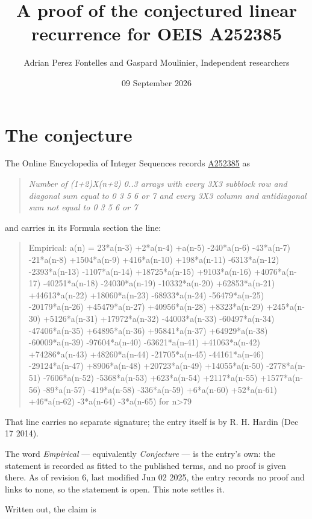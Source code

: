 \documentclass[11pt]{article}
\title{A proof of the conjectured linear recurrence for OEIS A252385}
\author{Adrian Perez Fontelles and Gaspard Moulinier, Independent researchers}
\date{09 September 2026}
\theoremstyle{definition}
\begin{document}
\maketitle
\section{The conjecture}

The Online Encyclopedia of Integer Sequences records \href{https://oeis.org/A252385}{A252385} as

\begin{quote}\itshape Number of (1+2)X(n+2) 0..3 arrays with every 3X3 subblock row and diagonal sum equal to 0 3 5 6 or 7 and every 3X3 column and antidiagonal sum not equal to 0 3 5 6 or 7\end{quote}

and carries in its Formula section the line:

\begin{quote}\ttfamily Empirical: a(n) = 23*a(n-3) +2*a(n-4) +a(n-5) -240*a(n-6) -43*a(n-7) -21*a(n-8) +1504*a(n-9) +416*a(n-10) +198*a(n-11) -6313*a(n-12) -2393*a(n-13) -1107*a(n-14) +18725*a(n-15) +9103*a(n-16) +4076*a(n-17) -40251*a(n-18) -24030*a(n-19) -10332*a(n-20) +62853*a(n-21) +44613*a(n-22) +18060*a(n-23) -68933*a(n-24) -56479*a(n-25) -20179*a(n-26) +45479*a(n-27) +40956*a(n-28) +8323*a(n-29) +245*a(n-30) +5126*a(n-31) +17972*a(n-32) -44003*a(n-33) -60497*a(n-34) -47406*a(n-35) +64895*a(n-36) +95841*a(n-37) +64929*a(n-38) -60009*a(n-39) -97604*a(n-40) -63621*a(n-41) +41063*a(n-42) +74286*a(n-43) +48260*a(n-44) -21705*a(n-45) -44161*a(n-46) -29124*a(n-47) +8906*a(n-48) +20723*a(n-49) +14055*a(n-50) -2778*a(n-51) -7606*a(n-52) -5368*a(n-53) +623*a(n-54) +2117*a(n-55) +1577*a(n-56) -89*a(n-57) -419*a(n-58) -336*a(n-59) +6*a(n-60) +52*a(n-61) +46*a(n-62) -3*a(n-64) -3*a(n-65) for n>79\end{quote}

That line carries no separate signature; the entry itself is by R. H. Hardin (Dec 17 2014).

The word {\itshape Empirical} --- equivalently {\itshape Conjecture} --- is the entry's own: the statement is recorded as fitted to the published terms, and no proof is given there. As of revision 6, last modified Jun 02 2025, the entry records no proof and links to none, so the statement is open. This note settles it.

Written out, the claim is
\end{document}
